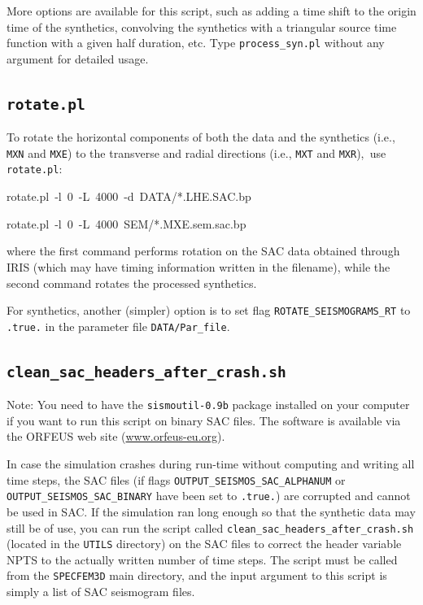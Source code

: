 \documentclass[oneside,english]{book}
\newenvironment{lyxcode}
{\begin{list}{}{
\setlength{\rightmargin}{\leftmargin}
\setlength{\listparindent}{0pt}%
\raggedright
\setlength{\itemsep}{0pt}
\setlength{\parsep}{0pt}
\normalfont\ttfamily}%
 \item[]}
{\end{list}}
\newcommand{\urlwithparentheses}[1]{(\url{#1})}
\begin{document}
More options are available for this script, such as adding a time shift
to the origin time of the synthetics, convolving the synthetics with
a triangular source time function with a given half duration, etc.
Type \texttt{process\_syn.pl} without any argument for detailed
usage.


\subsection{\texttt{rotate.pl}}

To rotate the horizontal components of both the data and the synthetics
(i.e., \texttt{MXN} and \texttt{MXE}) to the transverse and radial directions (i.e., \texttt{MXT} and \texttt{MXR}),\texttt{\small{}
}use{\small{} }\texttt{\small rotate.pl}:

\begin{lyxcode}
rotate.pl~-l~0~-L~4000~-d~DATA/{*}.LHE.SAC.bp~

rotate.pl~-l~0~-L~4000~SEM/{*}.MXE.sem.sac.bp~
\end{lyxcode}
where the first command performs rotation on the SAC data obtained
through IRIS (which may have timing information written in the filename),
while the second command rotates the processed synthetics.

For synthetics, another (simpler) option is to set flag \texttt{ROTATE\_SEISMOGRAMS\_RT}
to \texttt{.true.} in the parameter file \texttt{DATA/Par\_file}.


\subsection{\texttt{clean\_sac\_headers\_after\_crash.sh}}

Note: You need to have the \texttt{sismoutil-0.9b} package installed
on your computer if you want to run this script on binary SAC files.
The software is available via the ORFEUS web site \urlwithparentheses{www.orfeus-eu.org}.

In case the simulation crashes during run-time without computing and
writing all time steps, the SAC files (if flags \texttt{OUTPUT\_SEISMOS\_SAC\_ALPHANUM}
or \texttt{OUTPUT\_SEISMOS\_SAC\_BINARY} have been set to \texttt{.true.})
are corrupted and cannot be used in SAC. If the simulation
ran long enough so that the synthetic data may still be of use, you
can run the script called \texttt{clean\_sac\_headers\_after\_crash.sh}
(located in the \texttt{UTILS} directory) on the SAC files to correct
the header variable NPTS to the actually written number of time steps.
The script must be called from the \texttt{SPECFEM3D} main directory,
and the input argument to this script is simply a list of SAC seismogram
files.
\end{document}
